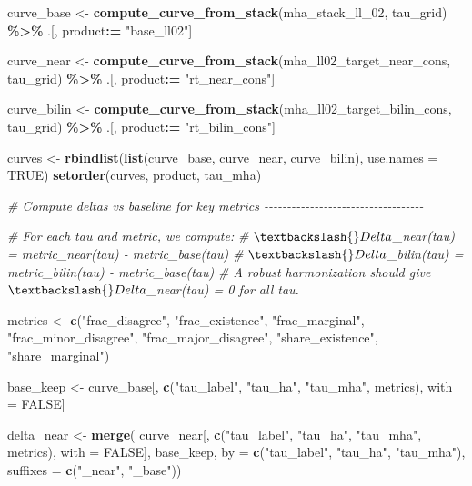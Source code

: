 \documentclass[
  11pt,
]{article}
\newenvironment{Shaded}{\begin{snugshade}}{\end{snugshade}}
\newcommand{\AttributeTok}[1]{\textcolor[rgb]{0.13,0.29,0.53}{#1}}
\newcommand{\CommentTok}[1]{\textcolor[rgb]{0.56,0.35,0.01}{\textit{#1}}}
\newcommand{\ConstantTok}[1]{\textcolor[rgb]{0.56,0.35,0.01}{#1}}
\newcommand{\FunctionTok}[1]{\textcolor[rgb]{0.13,0.29,0.53}{\textbf{#1}}}
\newcommand{\NormalTok}[1]{#1}
\newcommand{\OtherTok}[1]{\textcolor[rgb]{0.56,0.35,0.01}{#1}}
\newcommand{\SpecialCharTok}[1]{\textcolor[rgb]{0.81,0.36,0.00}{\textbf{#1}}}
\newcommand{\StringTok}[1]{\textcolor[rgb]{0.31,0.60,0.02}{#1}}
\begin{document}
\begin{Shaded}
\begin{Highlighting}[]
\NormalTok{curve\_base }\OtherTok{\textless{}{-}} \FunctionTok{compute\_curve\_from\_stack}\NormalTok{(mha\_stack\_ll\_02, tau\_grid) }\SpecialCharTok{\%\textgreater{}\%}
\NormalTok{  .[, product}\SpecialCharTok{:=} \StringTok{"base\_ll02"}\NormalTok{]}

\NormalTok{curve\_near }\OtherTok{\textless{}{-}} \FunctionTok{compute\_curve\_from\_stack}\NormalTok{(mha\_ll02\_target\_near\_cons, tau\_grid) }\SpecialCharTok{\%\textgreater{}\%}
\NormalTok{  .[, product}\SpecialCharTok{:=} \StringTok{"rt\_near\_cons"}\NormalTok{]}

\NormalTok{curve\_bilin }\OtherTok{\textless{}{-}} \FunctionTok{compute\_curve\_from\_stack}\NormalTok{(mha\_ll02\_target\_bilin\_cons, tau\_grid) }\SpecialCharTok{\%\textgreater{}\%}
\NormalTok{  .[, product}\SpecialCharTok{:=} \StringTok{"rt\_bilin\_cons"}\NormalTok{]}

\NormalTok{curves }\OtherTok{\textless{}{-}} \FunctionTok{rbindlist}\NormalTok{(}\FunctionTok{list}\NormalTok{(curve\_base, curve\_near, curve\_bilin), }\AttributeTok{use.names =} \ConstantTok{TRUE}\NormalTok{)}
\FunctionTok{setorder}\NormalTok{(curves, product, tau\_mha)}

\CommentTok{\# Compute deltas vs baseline for key metrics {-}{-}{-}{-}{-}{-}{-}{-}{-}{-}{-}{-}{-}{-}{-}{-}{-}{-}{-}{-}{-}{-}{-}{-}{-}{-}{-}{-}{-}{-}{-}{-}{-}{-}{-}}

\CommentTok{\# For each tau and metric, we compute:}
\CommentTok{\#   $\textbackslash{}Delta$\_near(tau)  = metric\_near(tau)  {-} metric\_base(tau)}
\CommentTok{\#   $\textbackslash{}Delta$\_bilin(tau) = metric\_bilin(tau) {-} metric\_base(tau)}
\CommentTok{\# A robust harmonization should give $\textbackslash{}Delta$\_near(tau) = 0 for all tau.}

\NormalTok{metrics }\OtherTok{\textless{}{-}} \FunctionTok{c}\NormalTok{(}\StringTok{"frac\_disagree"}\NormalTok{, }\StringTok{"frac\_existence"}\NormalTok{, }\StringTok{"frac\_marginal"}\NormalTok{,}
             \StringTok{"frac\_minor\_disagree"}\NormalTok{, }\StringTok{"frac\_major\_disagree"}\NormalTok{,}
             \StringTok{"share\_existence"}\NormalTok{, }\StringTok{"share\_marginal"}\NormalTok{)}

\NormalTok{base\_keep }\OtherTok{\textless{}{-}}\NormalTok{ curve\_base[, }\FunctionTok{c}\NormalTok{(}\StringTok{"tau\_label"}\NormalTok{, }\StringTok{"tau\_ha"}\NormalTok{, }\StringTok{"tau\_mha"}\NormalTok{, metrics), with }\OtherTok{=} \ConstantTok{FALSE}\NormalTok{]}

\NormalTok{delta\_near }\OtherTok{\textless{}{-}} \FunctionTok{merge}\NormalTok{(}
\NormalTok{  curve\_near[, }\FunctionTok{c}\NormalTok{(}\StringTok{"tau\_label"}\NormalTok{, }\StringTok{"tau\_ha"}\NormalTok{, }\StringTok{"tau\_mha"}\NormalTok{, metrics), }\AttributeTok{with =} \ConstantTok{FALSE}\NormalTok{],}
\NormalTok{  base\_keep,}
  \AttributeTok{by =} \FunctionTok{c}\NormalTok{(}\StringTok{"tau\_label"}\NormalTok{, }\StringTok{"tau\_ha"}\NormalTok{, }\StringTok{"tau\_mha"}\NormalTok{),}
  \AttributeTok{suffixes =} \FunctionTok{c}\NormalTok{(}\StringTok{"\_near"}\NormalTok{, }\StringTok{"\_base"}\NormalTok{))}


\end{Highlighting}
\end{Shaded}
\end{document}
